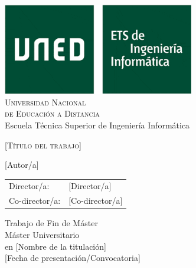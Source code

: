 \begin{titlepage}
\centering
	\includegraphics[height=4cm]{imagenes/logo_informatica_s.png}\\
	\vspace{0.25cm}
 	{\Large \textsc{{Universidad Nacional\\ de Educación a Distancia}}}\\
 	\vspace{0.8cm}
	{\Large Escuela Técnica Superior de Ingeniería Informática}\\
	\vspace{0.25cm}
	\vspace{1.5cm}
    \begin{spacing}{2}
 	{\textsc{\Huge [Título del trabajo]}}
    \end{spacing}
	\vfill
	{\Large [Autor/a]}\\
	\vspace{0.3cm}
	\begin{tabular}{ll}
	\large Director/a: & \large [Director/a]\\
	\vspace{0.3cm}
	\large Co-director/a: & \large [Co-director/a]
	\end{tabular}
	
	\vfill
	{\Large Trabajo de Fin de Máster}\\
	\vspace{0.3cm}
	{\large Máster Universitario\\ en [Nombre de la titulación]}\\
	\vspace{0.25cm}
	[Fecha de presentación/Convocatoria]
\end{titlepage}